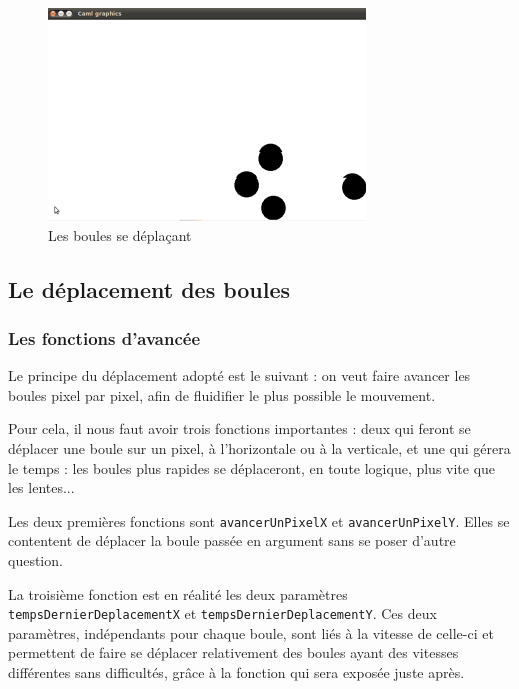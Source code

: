 \documentclass[10pt]{article}
\begin{document}
\begin{figure}
 \centering
\includegraphics{rapport2.png}
\caption{Les boules se déplaçant}
\end{figure}

\subsection{Le déplacement des boules}
\subsubsection{Les fonctions d'avancée}
Le principe du déplacement adopté est le suivant : on veut faire avancer les boules pixel par pixel, afin de fluidifier le plus possible le mouvement.
\par Pour cela, il nous faut avoir trois fonctions importantes : deux qui feront se déplacer une boule sur un pixel, à l'horizontale ou à la verticale,
et une qui gérera le temps : les boules plus rapides se déplaceront, en toute logique, plus vite que les lentes...
\par Les deux premières fonctions sont \texttt{avancerUnPixelX} et \texttt{avancerUnPixelY}. Elles se contentent de déplacer la boule
passée en argument sans se poser d'autre question.
\par La troisième fonction est en réalité les deux paramètres \texttt{tempsDernierDeplacementX} et \texttt{tempsDernierDeplacementY}.
Ces deux paramètres, indépendants pour chaque boule, sont liés à la vitesse de celle-ci et permettent de faire se déplacer relativement
des boules ayant des vitesses différentes sans difficultés, grâce à la fonction qui sera exposée juste après.
\end{document}
